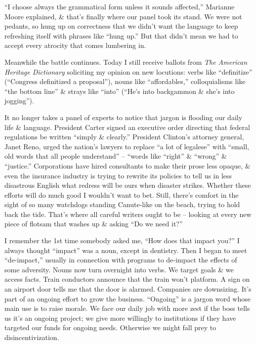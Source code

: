 \documentclass{article}
\begin{document}
``I choose always the grammatical form unless it sounds affected,'' Marianne Moore explained, \& that's finally where our panel took its stand. We were not pedants, so hung up on correctness that we didn't want the language to keep refreshing itself with phrases like ``hung up.'' But that didn't mean we had to accept every atrocity that comes lumbering in.

Meanwhile the battle continues. Today I still receive ballots from \textit{The American Heritage Dictionary} soliciting my opinion on new locutions: verbs like ``definitize'' (``Congress definitized a proposal''), nouns like ``affordables,'' colloquialisms like ``the bottom line'' \& strays like ``into'' (``He's into backgammon \& she's into jogging'').

It no longer takes a panel of experts to notice that jargon is flooding our daily life \& language. President Carter signed an executive order directing that federal regulations be written ``simply \& clearly.'' President Clinton's attorney general, Janet Reno, urged the nation's lawyers to replace ``a lot of legalese'' with ``small, old words that all people understand'' -- ``words like ``right'' \& ``wrong'' \& ``justice.'' Corporations have hired consultants to make their prose less opaque, \& even the insurance industry is trying to rewrite its policies to tell us in less disastrous English what redress will be ours when disaster strikes. Whether these efforts will do much good I wouldn't want to bet. Still, there's comfort in the sight of so many watchdogs standing Canute-like on the beach, trying to hold back the tide. That's where all careful writers ought to be -- looking at every new piece of flotsam that washes up \& asking ``Do we need it?''

I remember the 1st time somebody asked me, ``How does that impact you?'' I always thought ``impact'' was a noun, except in dentistry. Then I began to meet ``de-impact,'' usually in connection with programs to de-impact the effects of some adversity. Nouns now turn overnight into verbs. We target goals \& we access facts. Train conductors announce that the train won't platform. A sign on an airport door tells me that the door is alarmed. Companies are downsizing. It's part of an ongoing effort to grow the business. ``Ongoing'' is a jargon word whose main use is to raise morale. We face our daily job with more zest if the boss tells us it's an ongoing project; we give more willingly to institutions if they have targeted our funds for ongoing needs. Otherwise we might fall prey to disincentivization.
\end{document}
